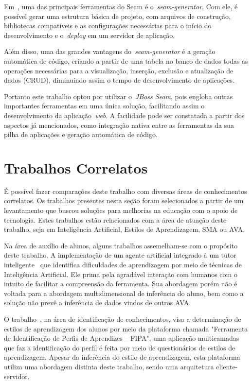 Em~\cite{allen09}, uma das principais ferramentas do Seam é o~\emph{seam-generator}. Com ele, é possível gerar uma estrutura básica de projeto, com arquivos de construção, bibliotecas compatíveis e as configurações necessárias para o início do desenvolvimento e o~\emph{deploy} em um servidor de aplicação.

Além disso, uma das grandes vantagens do~\emph{seam-generator} é a geração automática de código, criando a partir de uma tabela no banco de dados todas as operações necessárias para a visualização, inserção, exclusão e atualização de dados (CRUD), diminuindo assim o tempo de desenvolvimento de aplicações.

Portanto este trabalho optou por utilizar o~\emph{JBoss Seam}, pois engloba outras importantes ferramentas em uma única solução, facilitando assim o desenvolvimento da aplicação~\emph{web}. A facilidade pode ser constatada a partir dos aspectos já mencionados, como integração nativa entre as ferramentas da sua pilha de aplicações e geração automática de código.

\section{Trabalhos Correlatos}\label{section:trabcorrelatos}
É possível fazer comparações deste trabalho com diversas áreas de conhecimentos correlatos. Os trabalhos presentes nesta seção foram selecionados a partir de um levantamento que buscou soluções para melhorias na educação com o apoio de tecnologia. Estes trabalhos estão relacionados com a área de atuação deste trabalho, seja em Inteligência Artificial, Estilos de Aprendizagem, SMA ou AVA.

Na área de auxílio de alunos, alguns trabalhos assemelham-se com o propósito deste trabalho. A implementação de um agente artificial integrado à um tutor inteligente~\cite{soaresagente} que identifica dificuldades de aprendizagem por meio de técnicas de Inteligência Artificial. Ele prima pela agradável interação com humanos com o intuito de facilitar a compreensão da ferramenta. Sua abordagem porém não é voltada para a abordagem multidimensional de inferência do aluno, bem como a solução não prevê a inferência de dados vindos de outros AVA.

O trabalho~\cite{bativa2011}, na área de identificação de conhecimentos, visa a determinação de estilos de aprendizagem dos alunos por meio da plataforma chamada "Ferramenta de Identificação de Perfis de Aprendizes – FIPA", uma aplicação multicamadas que faz a identificação do perfil é feita por meio de questionários de estilos de aprendizagem. Apesar da inferência do estilo de aprendizagem, esta plataforma utiliza uma abordagem distinta deste trabalho, sendo uma arquitetura cliente-servidor. 

